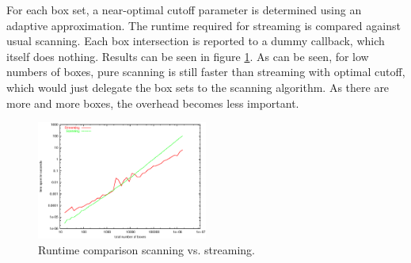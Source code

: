 For each box set, a near-optimal cutoff parameter is determined using an adaptive approximation. The runtime required for streaming is compared against usual scanning. Each box intersection is reported to a dummy callback, which itself does nothing. Results can be seen in figure \ref{fig_benchmark}. As can be seen, for low numbers of boxes, pure scanning is still faster than streaming with optimal cutoff, which would just delegate the box sets to the scanning algorithm. As there are more and more boxes, the overhead becomes less important.

\begin{ccTexOnly}
 \begin{figure}
  \begin{center}
  \includegraphics[width=0.5\textwidth]{../../../test/Box_intersection_d/benchmark.eps}
  \caption{Runtime comparison scanning vs. streaming.}
  \label{fig_benchmark}
  \end{center}
 \end{figure}
\end{ccTexOnly}



